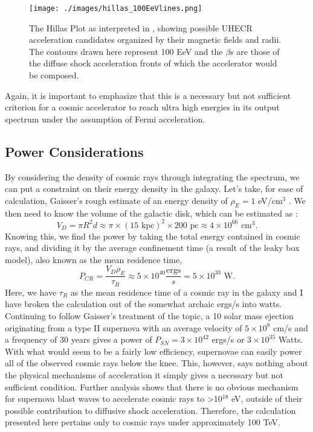 \begin{figure}[!h]
\begin{center}
\texttt{[image: ./images/hillas\_100EeVlines.png]}
\caption[Hillas Plot]{The Hillas Plot as interpreted in , showing possible UHECR acceleration candidates organized by their magnetic fields and radii. The contours drawn here represent 100 EeV and the $\beta$s are those of the diffuse shock acceleration fronts of which the accelerator would be composed.}
\label{hillasplot}
\end{center}
\end{figure}
Again, it is important to emphasize that this is a necessary but not sufficient criterion for a cosmic accelerator to reach ultra high energies in its output spectrum under the assumption of Fermi acceleration.%


\subsection{Power Considerations}
\label{power}
By considering the density of cosmic rays through integrating the spectrum, we can put a constraint on their energy density in the galaxy. Let's take, for ease of calculation, Gaisser's rough estimate of an energy density of $\rho_E=1$ eV/cm$^3$ \cite{crapp}. We then need to know the volume of the galactic disk, which can be estimated as :
$$V_D=\pi R^2 d\approx \pi \times (15\mbox{ kpc})^2\times200\mbox{ pc}\approx4\times10^{66}\mbox{ cm}^3.$$
Knowing this, we find the power by taking the total energy contained in cosmic rays, and dividing it by the average confinement time (a result of the leaky box model), also known as the mean residence time,
 $$P_{CR}=\frac{V_D \rho_E}{\tau_R}\approx 5\times10^{40} \frac{\mbox{ergs}}{s}=5\times10^{33}\mbox{ W}.$$
 Here, we have $\tau_R$ as the mean residence time of a cosmic ray in the galaxy and I have broken the calculation out of the somewhat archaic ergs/s into watts. Continuing to follow Gaisser's treatment of the topic, a 10 solar mass ejection originating from a type II supernova with an average velocity of $5\times 10^8$ cm/s and a frequency of 30 years gives a power of $P_{SN}=3\times10^{42}$ ergs/s or $3\times 10^{35}$ Watts. With what would seem to be a fairly low efficiency, supernovae can easily power all of the observed cosmic rays below the knee. This, however, says nothing about the physical mechanisms of acceleration it simply gives a necessary but not sufficient condition. Further analysis shows that there is no obvious mechanism for supernova blast waves to accelerate cosmic rays to \textgreater 10$^{18}$ eV, outside of their possible contribution to diffusive shock acceleration. Therefore, the calculation presented here pertains only to cosmic rays under approximately 100 TeV. 
 

